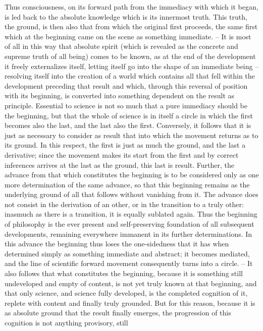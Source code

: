 Thus consciousness, on its forward path from the immediacy with which
it began, is led back to the absolute knowledge which is its innermost
truth. This truth, the ground, is then also that from which the original
first proceeds, the same first which at the beginning came on the scene as
something immediate. – It is most of all in this way that absolute spirit
(which is revealed as the concrete and supreme truth of all being) comes
to be known, as at the end of the development it freely externalizes itself,
letting itself go into the shape of an immediate being – resolving itself into
the creation of a world which contains all that fell within the development
preceding that result and which, through this reversal of position with
its beginning, is converted into something dependent on the result as
principle. Essential to science is not so much that a pure immediacy should
be the beginning, but that the whole of science is in itself a circle in which
the first becomes also the last, and the last also the first.
Conversely, it follows that it is just as necessary to consider as result that
into which the movement returns as to its ground. In this respect, the first
is just as much the ground, and the last a derivative; since the movement
makes its start from the first and by correct inferences arrives at the last as the
ground, this last is result. Further, the advance from that which constitutes
the beginning is to be considered only as one more determination of the
same advance, so that this beginning remains as the underlying ground of
all that follows without vanishing from it. The advance does not consist in
the derivation of an other, or in the transition to a truly other: inasmuch
as there is a transition, it is equally sublated again. Thus the beginning
of philosophy is the ever present and self-preserving foundation of all
subsequent developments, remaining everywhere immanent in its further
determinations.
In this advance the beginning thus loses the one-sidedness that it has
when determined simply as something immediate and abstract; it becomes
mediated, and the line of scientific forward movement consequently turns
into a circle. – It also follows that what constitutes the beginning, because it
is something still undeveloped and empty of content, is not yet truly known
at that beginning, and that only science, and science fully developed, is the
completed cognition of it, replete with content and finally truly grounded.
But for this reason, because it is as absolute ground that the result finally
emerges, the progression of this cognition is not anything provisory, still
